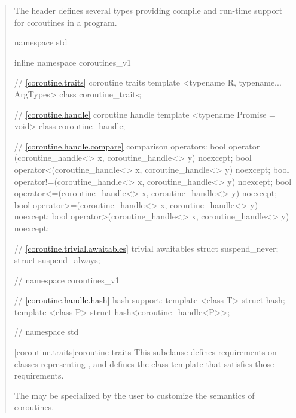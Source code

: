 \begin{quote}

\pnum
The header
defines several types providing compile and run-time support for coroutines in a \Cpp program.


%
%
\begin{codeblock}
namespace std {
  inline namespace coroutines_v1 {
    // \ref{coroutine.traits} coroutine traits
    template <typename R, typename... ArgTypes>
      class coroutine_traits;
  	
    // \ref{coroutine.handle} coroutine handle
    template <typename Promise = void>
      class coroutine_handle;		
  
    // \ref{coroutine.handle.compare} comparison operators:	
    bool operator==(coroutine_handle<> x, coroutine_handle<> y) noexcept;
    bool operator<(coroutine_handle<> x, coroutine_handle<> y) noexcept;			
    bool operator!=(coroutine_handle<> x, coroutine_handle<> y) noexcept;
    bool operator<=(coroutine_handle<> x, coroutine_handle<> y) noexcept;			
    bool operator>=(coroutine_handle<> x, coroutine_handle<> y) noexcept;
    bool operator>(coroutine_handle<> x, coroutine_handle<> y) noexcept;
    
    // \ref{coroutine.trivial.awaitables} trivial awaitables
    struct suspend_never;
    struct suspend_always;
    
  } // namespace coroutines_v1

  // \ref{coroutine.handle.hash} hash support:
  template <class T> struct hash;
  template <class P> struct hash<coroutine_handle<P>>;
} // namespace std
\end{codeblock}

[coroutine.traits]{coroutine traits}
\pnum
This subclause defines requirements on classes representing
,
and defines the class template
that satisfies those requirements.


\pnum
The  may be specialized by the user 
to customize the semantics of coroutines.


\end{quote}
